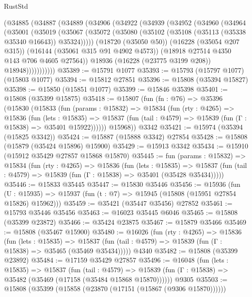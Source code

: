 \begin{lexlean}{RustStd}
\begin{coremodule}
      (@34885
        (@34887
          (@34889
            (@34906
              (@34922
                (@34939
                  (@34952
                    (@34960
                      (@34964
                        (@35001
                          (@35019
                            (@35067
                              (@35072
                                (@35080 (@35102 (@35108 (@35113 (@35338 @35340 @16643)) @35324)))))
                            (@18720 (@35050 @50))
                            (@16228 (@35054 @207 @315))
                            (@16144 (@35061 @315 @91 @4902 @4573))
                            (@18918 @27514 @4350 @143 @706 @4605 @27564))
                          @18936
                          (@16228 (@23775 @3199 @208))
                          @18948)))))))))))
@35389 := @15791 @1077
@35393 := @15793 (@15797 @1077) (@15803 @1077)
@35394 := @15812 @27851
@35396 := @15808 (@35394 @15827)
@35398 := @15850 (@15851 @1077)
@35399 := @15846 @35398
@35401 := @15808 (@35399 @15875)
@35418 := @15807
    (fun (fn : @76) =>
    @35396
      (@15830
        (@15833
          (fun (params : @15832) =>
          @15834
            (fun (rty : @4265) =>
            @15836
              (fun (lets : @15835) =>
              @15837 (fun (tail : @4579) => @15839 (fun (Γ : @15838) => @35401 @15922))))))
        @15968))
    @3342
@35421 := @15974 (@35394 (@15825 @3342))
@35424 := @15887 (@15888 @3342) @27854
@35428 := @15808 (@15879 (@35424 @15896) @15900)
@35429 := @15913 @3342
@35434 := @15910 (@15912 @35429 @27857 @15868 @15870)
@35445 := fun (params : @15832) =>
  @15834
    (fun (rty : @4265) =>
    @15836
      (fun (lets : @15835) =>
      @15837 (fun (tail : @4579) => @15839 (fun (Γ : @15838) => @35401 (@35428 @35434)))))
@35446 := @15833 @35445
@35447 := @15830 @35446
@35456 := @15936
    (fun (U : @15935) => @15937 (fun (t : @7) => @15945 (@15808 (@15951 @27854 @15826) @15962)))
@35459 := @35421 (@35447 @35456) @27852
@35461 := @15793 @35446 @35456
@35463 := @16023 @35445 @6046
@35465 := @15808 (@35399 @23872)
@35466 := @35424 @23875
@35467 := @15879 @35466
@35469 := @15808 (@35467 @15900)
@35480 := @16026
    (fun (rty : @4265) =>
    @15836
      (fun (lets : @15835) =>
      @15837 (fun (tail : @4579) => @15839 (fun (Γ : @15838) => @35465 (@35469 @35434)))))
    @4340
@35482 := @15808 (@35399 @23892)
@35484 := @17159 @35429 @27857
@35496 := @16048
    (fun (lets : @15835) =>
    @15837
      (fun (tail : @4579) =>
      @15839 (fun (Γ : @15838) => @35482 (@35469 (@17158 (@35484 @15868 @15870))))))
    @9305
@35503 := @15808 (@35399 (@15858 (@23870 (@17151 (@15867 (@9306 @15870))))))

\end{coremodule}
\end{lexlean}
